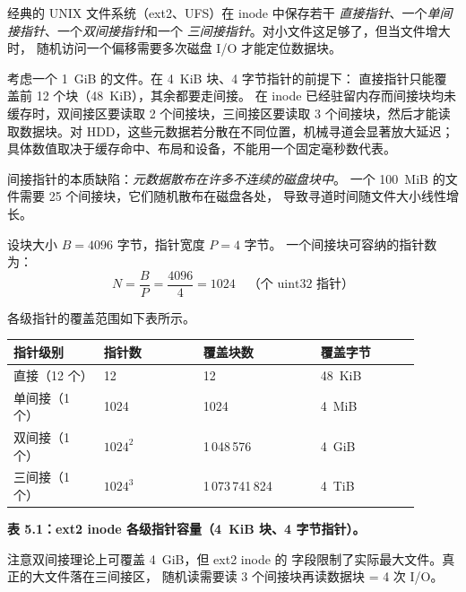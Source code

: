 \begin{filesystemlayout}


经典的 UNIX 文件系统（ext2、UFS）在 inode 中保存若干
\emph{直接指针}、一个\emph{单间接指针}、一个\emph{双间接指针}和一个
\emph{三间接指针}。对小文件这足够了，但当文件增大时，
随机访问一个偏移需要多次磁盘 I/O 才能定位数据块。

考虑一个 1~GiB 的文件。在 4~KiB 块、4 字节指针的前提下：
直接指针只能覆盖前 12 个块（48~KiB），其余都要走间接。
在 inode 已经驻留内存而间接块均未缓存时，双间接区要读取 2 个间接块，三间接区要读取 3 个间接块，然后才能读取数据块。对 HDD，这些元数据若分散在不同位置，机械寻道会显著放大延迟；具体数值取决于缓存命中、布局和设备，不能用一个固定毫秒数代表。

\begin{warningbox}
间接指针的本质缺陷：\emph{元数据散布在许多不连续的磁盘块中}。
一个 100~MiB 的文件需要 25 个间接块，它们随机散布在磁盘各处，
导致寻道时间随文件大小线性增长。
\end{warningbox}


设块大小 $B = 4096$ 字节，指针宽度 $P = 4$ 字节。
一个间接块可容纳的指针数为：
\[
N = \frac{B}{P} = \frac{4096}{4} = 1024 \quad\text{（个 uint32 指针）}
\]

各级指针的覆盖范围如下表所示。

\begin{longtable}{|F{0.20\linewidth}|F{0.22\linewidth}|F{0.26\linewidth}|F{0.22\linewidth}|}
\toprule
{}
\textbf{指针级别} & \textbf{指针数} & \textbf{覆盖块数} & \textbf{覆盖字节} \\
\midrule
直接（12 个）       & 12          & 12                & 48~KiB \\\tablerowrule
单间接（1 个）       & 1024        & 1024              & 4~MiB \\\tablerowrule
双间接（1 个）       & $1024^2$    & 1\,048\,576        & 4~GiB \\\tablerowrule
三间接（1 个）       & $1024^3$    & 1\,073\,741\,824   & 4~TiB \\
\bottomrule
\end{longtable}

{\par\noindent\textbf{表 5.1：ext2 inode 各级指针容量（4~KiB 块、4 字节指针）。}\par}

注意双间接理论上可覆盖 4~GiB，但 ext2 inode 的
 字段限制了实际最大文件。真正的大文件落在三间接区，
随机读需要读 3 个间接块再读数据块 = 4 次 I/O。


\end{filesystemlayout}
